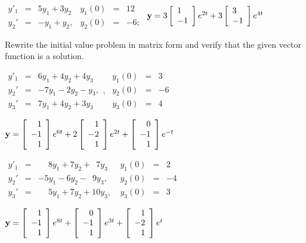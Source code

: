 \begin{exerciselist}
\begin{alist}
    \item %
    $\begin{array}{ccl}
      y'_{1} & = & 5y_{1}+3y_{2} \\
      y_{2}' & = & -y_{1}+y_{2},
    \end{array}
    \begin{array}{ccr}
      y_{1}(0) & = & 12  \\
      y_{2}(0) & = & -6;
    \end{array}$ \quad ${\bf y}=3\left[\begin{array}{l}1\\-1\end{array}\right]e^{2t}+3\left[\begin{array}{l}3\\-1\end{array}\right]e^{4t}$
  \end{alist}

  \item\label{exer:10.2.4} Rewrite the initial value problem in matrix form and verify that the
        given vector function is a solution.

  \begin{alist}
    \item %
    $\begin{array}{ccr}
      y'_{1} & = & 6y_{1}+4y_{2}+4y_{3}  \\
      y_{2}' & = & -7y_{1}-2y_{2}-y_{3}, \\
      y_{3}' & = & 7y_{1}+4y_{2}+3y_{3}
    \end{array},\;
    \begin{array}{ccr}
      y_{1}(0) & = & 3  \\
      y_{2}(0) & = & -6 \\
      y_{3}(0) & = & 4
    \end{array}$

    ${\bf y}=\left[\begin{array}{r}1\\-1\\1\end{array}\right]e^{6t}+2\left[\begin{array}{r}1\\-2\\1\end{array}\right]e^{2t}+\left[\begin{array}{r}0\\-1\\1\end{array}\right]e^{-t}$

    \item %
    $\begin{array}{ccr}
      y'_{1} & = & \phantom{-}8y_{1}+7y_{2}+\phantom{1}7y_{3} \\
      y_{2}' & = & -5y_{1}-6y_{2}-\phantom{1}9y_{3},          \\
      y_{3}' & = & \phantom{-}5y_{1}+7y_{2}+10y_{3},
    \end{array}\
    \begin{array}{ccr}
      y_{1}(0) & = & 2  \\
      y_{2}(0) & = & -4 \\
      y_{3}(0) & = & 3
    \end{array}$

    ${\bf y}=\left[\begin{array}{r}1\\-1\\1\end{array}\right]e^{8t}+\left[\begin{array}{r}0\\-1\\1\end{array}\right]e^{3t}+\left[\begin{array}{r}1\\-2\\1\end{array}\right]e^{t}$
  \end{alist}


\end{exerciselist}
